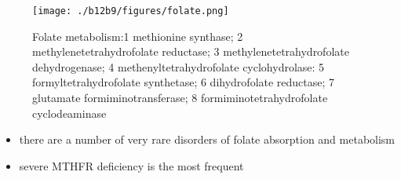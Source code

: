 \documentclass{scrartcl}
\begin{document}
\begin{figure}[htbp]
\centering
\texttt{[image: ./b12b9/figures/folate.png]}
\caption{\label{fig:orgbf72891}
Folate metabolism:1 methionine synthase; 2 methylenetetrahydrofolate reductase; 3 methylenetetrahydrofolate dehydrogenase; 4 methenyltetrahydrofolate cyclohydrolase: 5 formyltetrahydrofolate synthetase; 6 dihydrofolate reductase; 7 glutamate formiminotransferase; 8 formiminotetrahydrofolate cyclodeaminase}
\end{figure}

\begin{itemize}
\item there are a number of very rare disorders of folate absorption and metabolism
\item severe MTHFR deficiency is the most frequent
\end{itemize}
\end{document}
